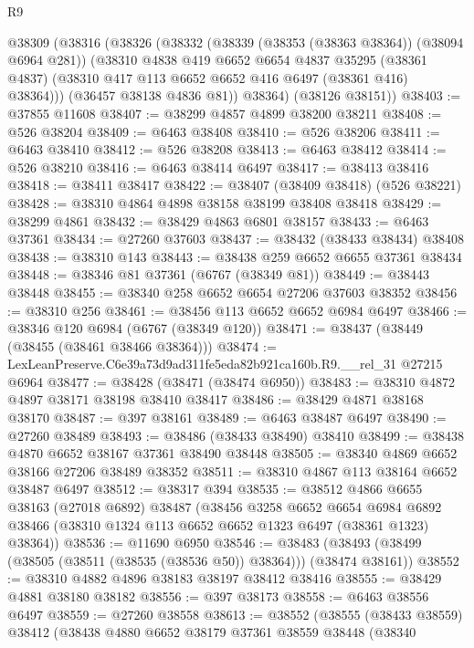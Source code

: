 \begin{lexlean}{R9}
\begin{coremodule}
    @38309
      (@38316
        (@38326
          (@38332
            (@38339 (@38353 (@38363 @38364)) (@38094 @6964 @281))
            (@38310
              @4838
              @419
              @6652
              @6654
              @4837
              @35295
              (@38361 @4837)
              (@38310 @417 @113 @6652 @6652 @416 @6497 (@38361 @416) @38364)))
          (@36457 @38138 @4836 @81))
        @38364)
      (@38126 @38151))
@38403 := @37855 @11608
@38407 := @38299 @4857 @4899 @38200 @38211
@38408 := @526 @38204
@38409 := @6463 @38408
@38410 := @526 @38206
@38411 := @6463 @38410
@38412 := @526 @38208
@38413 := @6463 @38412
@38414 := @526 @38210
@38416 := @6463 @38414 @6497
@38417 := @38413 @38416
@38418 := @38411 @38417
@38422 := @38407 (@38409 @38418) (@526 @38221)
@38428 := @38310 @4864 @4898 @38158 @38199 @38408 @38418
@38429 := @38299 @4861
@38432 := @38429 @4863 @6801 @38157
@38433 := @6463 @37361
@38434 := @27260 @37603
@38437 := @38432 (@38433 @38434) @38408
@38438 := @38310 @143
@38443 := @38438 @259 @6652 @6655 @37361 @38434
@38448 := @38346 @81 @37361 (@6767 (@38349 @81))
@38449 := @38443 @38448
@38455 := @38340 @258 @6652 @6654 @27206 @37603 @38352
@38456 := @38310 @256
@38461 := @38456 @113 @6652 @6652 @6984 @6497
@38466 := @38346 @120 @6984 (@6767 (@38349 @120))
@38471 := @38437 (@38449 (@38455 (@38461 @38466 @38364)))
@38474 := LexLeanPreserve.C6e39a73d9ad311fe5eda82b921ca160b.R9.__rel_31 @27215 @6964
@38477 := @38428 (@38471 (@38474 @6950))
@38483 := @38310 @4872 @4897 @38171 @38198 @38410 @38417
@38486 := @38429 @4871 @38168 @38170
@38487 := @397 @38161
@38489 := @6463 @38487 @6497
@38490 := @27260 @38489
@38493 := @38486 (@38433 @38490) @38410
@38499 := @38438 @4870 @6652 @38167 @37361 @38490 @38448
@38505 := @38340 @4869 @6652 @38166 @27206 @38489 @38352
@38511 := @38310 @4867 @113 @38164 @6652 @38487 @6497
@38512 := @38317 @394
@38535 := @38512
    @4866
    @6655
    @38163
    (@27018 @6892)
    @38487
    (@38456
      @3258
      @6652
      @6654
      @6984
      @6892
      @38466
      (@38310 @1324 @113 @6652 @6652 @1323 @6497 (@38361 @1323) @38364))
@38536 := @11690 @6950
@38546 := @38483 (@38493 (@38499 (@38505 (@38511 (@38535 (@38536 @50)) @38364))) (@38474 @38161))
@38552 := @38310 @4882 @4896 @38183 @38197 @38412 @38416
@38555 := @38429 @4881 @38180 @38182
@38556 := @397 @38173
@38558 := @6463 @38556 @6497
@38559 := @27260 @38558
@38613 := @38552
    (@38555
      (@38433 @38559)
      @38412
      (@38438
        @4880
        @6652
        @38179
        @37361
        @38559
        @38448
        (@38340

\end{coremodule}
\end{lexlean}
